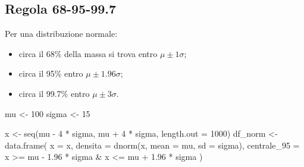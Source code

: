 \documentclass[
  italian,
  letterpaper,
  a4paper,
  11pt,
  open=any]{scrbook}
\newenvironment{Shaded}{\begin{snugshade}}{\end{snugshade}}
\newcommand{\AttributeTok}[1]{\textcolor[rgb]{0.40,0.45,0.13}{#1}}
\newcommand{\DecValTok}[1]{\textcolor[rgb]{0.68,0.00,0.00}{#1}}
\newcommand{\FloatTok}[1]{\textcolor[rgb]{0.68,0.00,0.00}{#1}}
\newcommand{\FunctionTok}[1]{\textcolor[rgb]{0.28,0.35,0.67}{#1}}
\newcommand{\NormalTok}[1]{\textcolor[rgb]{0.00,0.23,0.31}{#1}}
\newcommand{\OtherTok}[1]{\textcolor[rgb]{0.00,0.23,0.31}{#1}}
\newcommand{\SpecialCharTok}[1]{\textcolor[rgb]{0.37,0.37,0.37}{#1}}
\providecommand{\tightlist}{%
  \setlength{\itemsep}{0pt}\setlength{\parskip}{0pt}}
\theoremstyle{plain}
\theoremstyle{definition}
\theoremstyle{definition}
\theoremstyle{remark}
\begin{document}
\subsection{Regola 68-95-99.7}\label{regola-68-95-99.7}

Per una distribuzione normale:

\begin{itemize}
\tightlist
\item
  circa il 68\% della massa si trova entro \(\mu \pm 1\sigma\);
\item
  circa il 95\% entro \(\mu \pm 1.96\sigma\);
\item
  circa il 99.7\% entro \(\mu \pm 3\sigma\).
\end{itemize}

\begin{Shaded}
\begin{Highlighting}[]
\NormalTok{mu }\OtherTok{\textless{}{-}} \DecValTok{100}
\NormalTok{sigma }\OtherTok{\textless{}{-}} \DecValTok{15}

\NormalTok{x }\OtherTok{\textless{}{-}} \FunctionTok{seq}\NormalTok{(mu }\SpecialCharTok{{-}} \DecValTok{4} \SpecialCharTok{*}\NormalTok{ sigma, mu }\SpecialCharTok{+} \DecValTok{4} \SpecialCharTok{*}\NormalTok{ sigma, }\AttributeTok{length.out =} \DecValTok{1000}\NormalTok{)}
\NormalTok{df\_norm }\OtherTok{\textless{}{-}} \FunctionTok{data.frame}\NormalTok{(}
  \AttributeTok{x =}\NormalTok{ x,}
  \AttributeTok{densita =} \FunctionTok{dnorm}\NormalTok{(x, }\AttributeTok{mean =}\NormalTok{ mu, }\AttributeTok{sd =}\NormalTok{ sigma),}
  \AttributeTok{centrale\_95 =}\NormalTok{ x }\SpecialCharTok{\textgreater{}=}\NormalTok{ mu }\SpecialCharTok{{-}} \FloatTok{1.96} \SpecialCharTok{*}\NormalTok{ sigma }\SpecialCharTok{\&}\NormalTok{ x }\SpecialCharTok{\textless{}=}\NormalTok{ mu }\SpecialCharTok{+} \FloatTok{1.96} \SpecialCharTok{*}\NormalTok{ sigma}
\NormalTok{)}


\end{Highlighting}
\end{Shaded}
\end{document}
